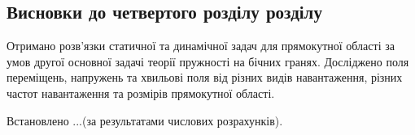 \subsection{Висновки до четвертого розділу розділу}
Отримано розв'язки статичної та динамічної задач для прямокутної області за умов другої основної задачі теорії пружності на бічних гранях.
Досліджено поля переміщень, напружень та хвильові поля від різних видів навантаження, різних частот навантаження та розмірів прямокутної області.

Встановлено ...(за результатами числових розрахунків).